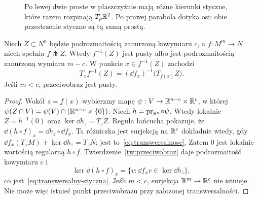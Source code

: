 \begin{figure}[htbp]
\centering
{}
\caption{Po lewej dwie proste w płaszczyźnie mają
różne kierunki styczne, które razem rozpinają
$T_p\mathbb{R}^2$. Po prawej parabola dotyka osi:
obie przestrzenie styczne są tą samą prostą.}
\label{fig:transwersalne-przeciecia}
\end{figure}

\begin{twierdzenie}
\label{thm:transwersalny-przeciwobraz}
Niech $Z\subset N^n$ będzie podrozmaitością
zanurzoną kowymiaru $c$, a $f:M^m\to N$
niech spełnia $f\pitchfork Z$. Wtedy
$f^{-1}(Z)$ jest pusty albo jest
podrozmaitością zanurzoną wymiaru $m-c$.
W punkcie $x\in f^{-1}(Z)$ zachodzi
\begin{equation}\label{eq:transwersalny-styczna}
 T_xf^{-1}(Z)
  =(\dd f_x)^{-1}\bigl(T_{f(x)}Z\bigr).
\end{equation}
Jeśli $m<c$, przeciwobraz jest pusty.
\end{twierdzenie}
\begin{proof}
Wokół $z=f(x)$ wybierzmy mapę
$\psi:V\to\mathbb{R}^{n-c}\times\mathbb{R}^c$, w której
$\psi(Z\cap V)=\psi(V)\cap(\mathbb{R}^{n-c}\times\{0\})$.
Niech $h=\operatorname{pr}_{\mathbb{R}^c}\circ\psi$.
Wtedy lokalnie $Z=h^{-1}(0)$ oraz
$\ker\dd h_z=T_zZ$.
Reguła łańcucha pokazuje, że
$\dd(h\circ f)_x=\dd h_z\circ\dd f_x$.
Ta różniczka jest surjekcją na $\mathbb{R}^c$
dokładnie wtedy, gdy
$\dd f_x(T_xM)+\ker\dd h_z=T_zN$;
jest to~\eqref{eq:transwersalnosc}.
Zatem $0$ jest lokalnie wartością regularną
$h\circ f$. Twierdzenie~\ref{tw:przeciwobraz}
daje podrozmaitość kowymiaru $c$ i
\[
 \ker\dd(h\circ f)_x
  =\{v:\dd f_xv\in\ker\dd h_z\},
\]
co jest~\eqref{eq:transwersalny-styczna}.
Jeśli $m<c$, surjekcja $\mathbb{R}^m\to\mathbb{R}^c$
nie istnieje. Nie może więc istnieć punkt
przeciwobrazu przy założonej transwersalności.
\end{proof}

